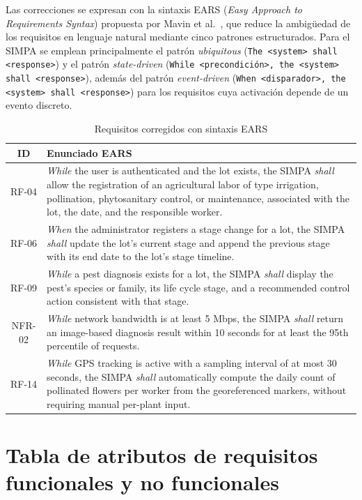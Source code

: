 \documentclass[11pt,a4paper]{report}
\begin{document}
Las correcciones se expresan con la sintaxis EARS (\textit{Easy Approach to Requirements Syntax})
propuesta por Mavin et al.~\cite{mavin2009}, que reduce la ambigüedad de los requisitos en lenguaje
natural mediante cinco patrones estructurados. Para el SIMPA se emplean principalmente el patrón
\textit{ubiquitous} (\texttt{The <system> shall <response>}) y el patrón \textit{state-driven}
(\texttt{While <precondición>, the <system> shall <response>}), además del patrón
\textit{event-driven} (\texttt{When <disparador>, the <system> shall <response>}) para los requisitos
cuya activación depende de un evento discreto.

\begin{table}[H]
\centering
\small
\caption{Requisitos corregidos con sintaxis EARS}
\label{tab:ears}
\begin{tabularx}{\linewidth}{|c|Y|}
\hline
\textbf{ID} & \textbf{Enunciado EARS} \\
\hline
RF-04 & \textit{While} the user is authenticated and the lot exists, the SIMPA \textit{shall} allow the
registration of an agricultural labor of type irrigation, pollination, phytosanitary control, or
maintenance, associated with the lot, the date, and the responsible worker. \\
\hline
RF-06 & \textit{When} the administrator registers a stage change for a lot, the SIMPA \textit{shall}
update the lot's current stage and append the previous stage with its end date to the lot's stage
timeline. \\
\hline
RF-09 & \textit{While} a pest diagnosis exists for a lot, the SIMPA \textit{shall} display the pest's
species or family, its life cycle stage, and a recommended control action consistent with that stage. \\
\hline
NFR-02 & \textit{While} network bandwidth is at least 5 Mbps, the SIMPA \textit{shall} return an
image-based diagnosis result within 10 seconds for at least the 95th percentile of requests. \\
\hline
RF-14 & \textit{While} GPS tracking is active with a sampling interval of at most 30 seconds, the
SIMPA \textit{shall} automatically compute the daily count of pollinated flowers per worker from the
georeferenced markers, without requiring manual per-plant input. \\
\hline
\end{tabularx}
\end{table}

\section{Tabla de atributos de requisitos funcionales y no funcionales}
\end{document}

